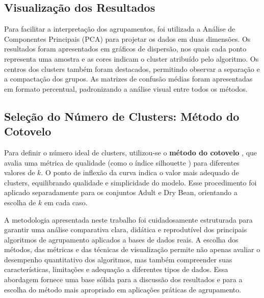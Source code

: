 \subsection{Visualização dos Resultados}

Para facilitar a interpretação dos agrupamentos, foi utilizada a Análise de Componentes Principais (PCA) para projetar os dados em duas dimensões. Os resultados foram apresentados em gráficos de dispersão, nos quais cada ponto representa uma amostra e as cores indicam o cluster atribuído pelo algoritmo. Os centros dos clusters também foram destacados, permitindo observar a separação e a compactação dos grupos. As matrizes de confusão médias foram apresentadas em formato percentual, padronizando a análise visual entre todos os métodos.

\subsection{Seleção do Número de Clusters: Método do Cotovelo}

Para definir o número ideal de clusters, utilizou-se o \textbf{método do cotovelo} \cite{thorndike1953belongs,rousseeuw1987silhouettes}, que avalia uma métrica de qualidade (como o índice silhouette \cite{rousseeuw1987silhouettes}) para diferentes valores de $k$. O ponto de inflexão da curva indica o valor mais adequado de clusters, equilibrando qualidade e simplicidade do modelo. Esse procedimento foi aplicado separadamente para os conjuntos Adult e Dry Bean, orientando a escolha de $k$ em cada caso.

A metodologia apresentada neste trabalho foi cuidadosamente estruturada para garantir uma análise comparativa clara, didática e reprodutível dos principais algoritmos de agrupamento aplicados a bases de dados reais. A escolha dos métodos, das métricas e das técnicas de visualização permite não apenas avaliar o desempenho quantitativo dos algoritmos, mas também compreender suas características, limitações e adequação a diferentes tipos de dados. Essa abordagem fornece uma base sólida para a discussão dos resultados e para a escolha do método mais apropriado em aplicações práticas de agrupamento.




